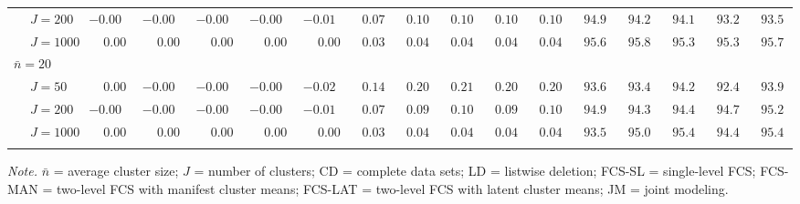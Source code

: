 \begin{sidewaystable}
\begin{threeparttable}
\begin{tabular}{llccccccccccccccc}
 & \nopagebreak $\;J=200$  & ${-}0.00\phantom{0}$ & ${-}0.00\phantom{0}$ & ${-}0.00\phantom{0}$ & ${-}0.00\phantom{0}$ & ${-}0.01\phantom{0}$ & $\phantom{0}0.07\phantom{0}$ & $\phantom{0}0.10\phantom{0}$ & $\phantom{0}0.10\phantom{0}$ & $\phantom{0}0.10\phantom{0}$ & $\phantom{0}0.10\phantom{0}$ & $\phantom{0}94.9\phantom{0}$ & $\phantom{0}94.2\phantom{0}$ & $\phantom{0}94.1\phantom{0}$ & $\phantom{0}93.2\phantom{0}$ & $\phantom{0}93.5\phantom{0}$ \\
 & \nopagebreak $\;J=1000$  & $\phantom{-}0.00\phantom{0}$ & $\phantom{-}0.00\phantom{0}$ & $\phantom{-}0.00\phantom{0}$ & $\phantom{-}0.00\phantom{0}$ & $\phantom{-}0.00\phantom{0}$ & $\phantom{0}0.03\phantom{0}$ & $\phantom{0}0.04\phantom{0}$ & $\phantom{0}0.04\phantom{0}$ & $\phantom{0}0.04\phantom{0}$ & $\phantom{0}0.04\phantom{0}$ & $\phantom{0}95.6\phantom{0}$ & $\phantom{0}95.8\phantom{0}$ & $\phantom{0}95.3\phantom{0}$ & $\phantom{0}95.3\phantom{0}$ & $\phantom{0}95.7\phantom{0}$ \\
\multicolumn{4}{l}{$\bar{n}=20$} \\  & \nopagebreak $\;J=50$  & $\phantom{-}0.00\phantom{0}$ & ${-}0.00\phantom{0}$ & ${-}0.00\phantom{0}$ & ${-}0.00\phantom{0}$ & ${-}0.02\phantom{0}$ & $\phantom{0}0.14\phantom{0}$ & $\phantom{0}0.20\phantom{0}$ & $\phantom{0}0.21\phantom{0}$ & $\phantom{0}0.20\phantom{0}$ & $\phantom{0}0.20\phantom{0}$ & $\phantom{0}93.6\phantom{0}$ & $\phantom{0}93.4\phantom{0}$ & $\phantom{0}94.2\phantom{0}$ & $\phantom{0}92.4\phantom{0}$ & $\phantom{0}93.9\phantom{0}$ \\
 & \nopagebreak $\;J=200$  & ${-}0.00\phantom{0}$ & ${-}0.00\phantom{0}$ & ${-}0.00\phantom{0}$ & ${-}0.00\phantom{0}$ & ${-}0.01\phantom{0}$ & $\phantom{0}0.07\phantom{0}$ & $\phantom{0}0.09\phantom{0}$ & $\phantom{0}0.10\phantom{0}$ & $\phantom{0}0.09\phantom{0}$ & $\phantom{0}0.10\phantom{0}$ & $\phantom{0}94.9\phantom{0}$ & $\phantom{0}94.3\phantom{0}$ & $\phantom{0}94.4\phantom{0}$ & $\phantom{0}94.7\phantom{0}$ & $\phantom{0}95.2\phantom{0}$ \\
 & \nopagebreak $\;J=1000$  & $\phantom{-}0.00\phantom{0}$ & $\phantom{-}0.00\phantom{0}$ & $\phantom{-}0.00\phantom{0}$ & $\phantom{-}0.00\phantom{0}$ & $\phantom{-}0.00\phantom{0}$ & $\phantom{0}0.03\phantom{0}$ & $\phantom{0}0.04\phantom{0}$ & $\phantom{0}0.04\phantom{0}$ & $\phantom{0}0.04\phantom{0}$ & $\phantom{0}0.04\phantom{0}$ & $\phantom{0}93.5\phantom{0}$ & $\phantom{0}95.0\phantom{0}$ & $\phantom{0}95.4\phantom{0}$ & $\phantom{0}94.4\phantom{0}$ & $\phantom{0}95.4\phantom{0}$ \\
[0.5ex]\hline\\[-1.6ex] 
\end{tabular}
\begin{tablenotes}{\footnotesize \textit{Note.} $\bar{n}$ = average cluster size; $J$ = number of clusters; CD = complete data sets; LD = listwise deletion; FCS-SL = single-level FCS; FCS-MAN = two-level FCS with manifest cluster means; FCS-LAT = two-level FCS with latent cluster means; JM = joint modeling.}\end{tablenotes}
\end{threeparttable}
\end{sidewaystable}
